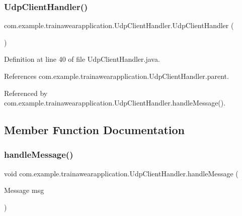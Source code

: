\subsubsection{\texorpdfstring{UdpClientHandler()}{UdpClientHandler()}}
{\footnotesize\ttfamily com.\+example.\+trainawearapplication.\+Udp\+Client\+Handler.\+Udp\+Client\+Handler (\begin{DoxyParamCaption}{ }\end{DoxyParamCaption})}



Definition at line 40 of file Udp\+Client\+Handler.\+java.


\begin{DoxyCode}{0}

\end{DoxyCode}


References com.\+example.\+trainawearapplication.\+Udp\+Client\+Handler.\+parent.



Referenced by com.\+example.\+trainawearapplication.\+Udp\+Client\+Handler.\+handle\+Message().



\subsection{Member Function Documentation}
\mbox{\label{classcom_1_1example_1_1trainawearapplication_1_1_udp_client_handler_a433f624fad2243aaed2e97f7f3cb8434}} 
\subsubsection{\texorpdfstring{handleMessage()}{handleMessage()}}
{\footnotesize\ttfamily void com.\+example.\+trainawearapplication.\+Udp\+Client\+Handler.\+handle\+Message (\begin{DoxyParamCaption}\item[{Message}]{msg }\end{DoxyParamCaption})}



